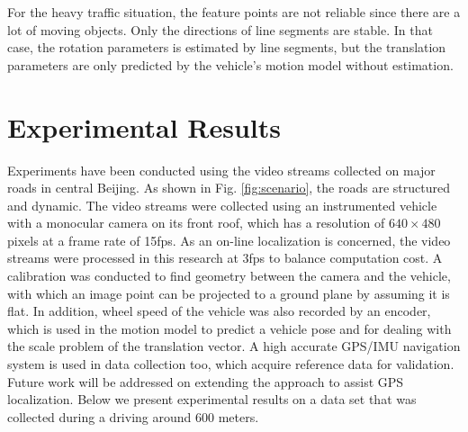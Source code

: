 \documentclass[letterpaper, 10 pt, conference]{ieeeconf}  %
\begin{document}

For the heavy traffic situation, the feature points are not reliable since there are a lot of moving objects. Only the directions of line segments are stable. In that case, the rotation parameters is estimated by line segments, but the translation parameters are only predicted by the vehicle's motion model without estimation.


\section{Experimental Results}
\label{sec_experiments}
Experiments have been conducted using the video streams collected on major roads in central Beijing. As shown in Fig. \ref{fig:scenario}, the roads are structured and dynamic. The video streams were collected using an instrumented vehicle with a monocular camera on its front roof, which has a resolution of $640\times480$ pixels at a frame rate of 15fps. As an on-line localization is concerned, the video streams were processed in this research at 3fps to balance computation cost. A calibration was conducted to find geometry between the camera and the vehicle, with which an image point can be projected to a ground plane by assuming it is flat. In addition, wheel speed of the vehicle was also recorded by an encoder, which is used in the motion model to predict a vehicle pose and for dealing with the scale problem of the translation vector. A high accurate GPS/IMU navigation system is used in data collection too, which acquire reference data for validation. Future work will be addressed on extending the approach to assist GPS localization. Below we present experimental results on a data set that was collected during a driving around 600 meters.
\end{document}
